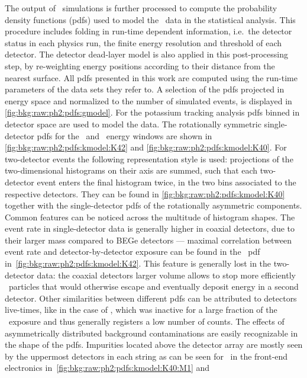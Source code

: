 The output of \mage\ simulations is further processed to compute the probability density
functions (pdfs) used to model the \gerda\ data in the statistical analysis. This
procedure includes folding in run-time dependent information, i.e.~the detector status in
each physics run, the finite energy resolution and threshold of each detector. The
detector dead-layer model is also applied in this post-processing step, by re-weighting
energy positions according to their distance from the nearest surface. All pdfs presented
in this work are computed using the run-time parameters of the data sets they refer
to. A selection of the pdfs projected in energy space and normalized to the number of
simulated events, is displayed in \cref{fig:bkg:raw:ph2:pdfs:gmodel}.
\newpar
For the potassium tracking analysis pdfs binned in detector space are used to model the
data. The rotationally symmetric single-detector pdfs for the \kvn\ and \kvz\ energy
windows are shown in \cref{fig:bkg:raw:ph2:pdfs:kmodel:K42} and
\cref{fig:bkg:raw:ph2:pdfs:kmodel:K40}. For two-detector events the following
representation style is used: projections of the two-dimensional histograms on their axis
are summed, such that each two-detector event enters the final histogram twice, in the two
bins associated to the respective detectors. They can be found in
\cref{fig:bkg:raw:ph2:pdfs:kmodel:K40} together with the single-detector pdfs of the
rotationally asymmetric components.
\newpar
Common features can be noticed across the multitude of histogram shapes. The event rate in
single-detector data is generally higher in coaxial detectors, due to their larger mass
compared to BEGe detectors --- maximal correlation between event rate and
detector-by-detector exposure can be found in the \nnbb\ pdf
in~\cref{fig:bkg:raw:ph2:pdfs:kmodel:K42}. This feature is generally lost in the
two-detector data: the coaxial detectors larger volume allows to stop more efficiently \g\
particles that would otherwise escape and eventually deposit energy in a second detector.
Other similarities between different pdfs can be attributed to detectors live-times, like
in the case of \GD{91C}, which was inactive for a large fraction of the \phasetwo\
exposure and thus generally registers a low number of counts. The effects of
asymmetrically distributed background contaminations are easily recognizable in the shape
of the pdfs. Impurities located above the detector array are mostly seen by the uppermost
detectors in each string as can be seen for \kvn\ in the front-end electronics
in~\cref{fig:bkg:raw:ph2:pdfs:kmodel:K40:M1} and
